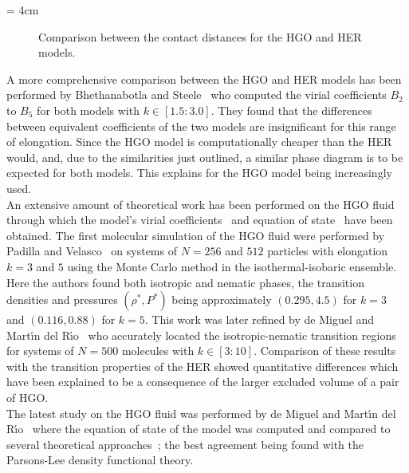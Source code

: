 \picW = 4cm
\begin{figure}
	\centering
	\caption{Comparison between the contact distances for the HGO and HER models.}
	\label{fig:HGO_CD}
\end{figure}

A more comprehensive comparison between the HGO and HER models has been performed by
Bhethanabotla and Steele~\cite{BhethanabotlaSteele87} who computed the virial coefficients $B_2$
to $B_5$ for both models with $k\in[1.5:3.0]$. They found that the differences between
equivalent coefficients of the two models are insignificant for this range of elongation. 
Since the HGO model is computationally cheaper than the HER would, and, due to the similarities
just outlined, a similar phase diagram is to be expected for both models. This explains for
the HGO model being increasingly used.\\

An extensive amount of theoretical work has been performed on the HGO
fluid through which the model's virial  coefficients~\cite{Rigby70,BhethanabotlaSteele87,Rigby89} 
and equation of  state~\cite{BoublikPena90,MaesoSolana93} have been obtained. 
The first molecular simulation of the HGO
fluid were performed by Padilla and Velasco~\cite{PadillaVelasco97} on systems of $N=256$
and $512$ particles with elongation $k=3$ and $5$ using the Monte Carlo method in the
isothermal-isobaric ensemble. Here the authors found both isotropic and nematic phases, the
transition densities and pressures $(\rho^*, P^*)$ being approximately  $(0.295, 4.5)$ for $k=3$
and $(0.116,0.88)$ for $k=5$. This work was later refined by de Miguel and Mart\'{\i}n
del R\'{\i}o~\cite{DeMiguelDelRio01} who accurately located the isotropic-nematic transition
regions for systems of $N=500$ molecules with $k \in [3:10]$. Comparison of these results with
the transition properties of the HER showed quantitative differences which have been explained
to be a consequence of the larger excluded volume of a pair of HGO.\\ 
The latest study on the HGO fluid was performed by de Miguel and Mart\'{\i}n 
del R\'{\i}o~\cite{DeMiguelDelRio03}
where the equation  of state of the model was computed and compared to several theoretical 
approaches~; the best  agreement being found with the Parsons-Lee density functional theory.















